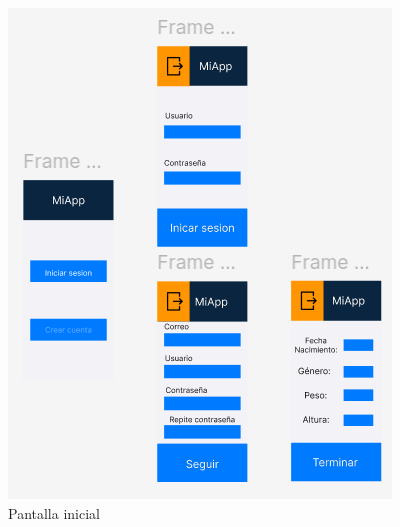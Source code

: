 \begin{figure}[H]
  \centering
  \begin{minipage}[b]{0.6\textwidth}
    \centering
    \includegraphics[width=\textwidth]{fotos/Init.png}
    \caption{Pantalla inicial}
    \label{fig:Pantalla inicial}
  \end{minipage}
  \hfill
  \begin{minipage}[b]{0.35\textwidth}
    \centering

\end{minipage}
\end{figure}
